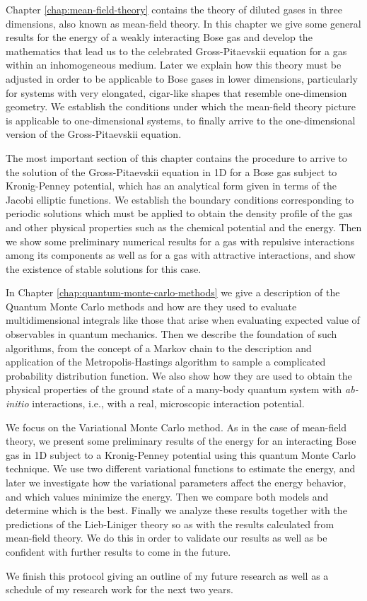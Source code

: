 Chapter \ref{chap:mean-field-theory} contains the theory of diluted gases in
three dimensions, also known as mean-field theory. In this chapter we give some
general results for the energy of a weakly interacting Bose gas and develop the
mathematics that lead us to the celebrated Gross-Pitaevskii equation for a gas
within an inhomogeneous medium. Later we explain how this theory must be
adjusted in order to be applicable to Bose gases in lower dimensions,
particularly for systems with very elongated, cigar-like shapes that resemble
one-dimension geometry. We establish the conditions under which the mean-field
theory picture is applicable to one-dimensional systems, to finally arrive to
the one-dimensional version of the Gross-Pitaevskii equation.

The most important section of this chapter contains the procedure to arrive to
the solution of the Gross-Pitaevskii equation in 1D for a Bose gas subject to
Kronig-Penney potential, which has an analytical form given in terms of the
Jacobi elliptic functions. We establish the boundary conditions corresponding to
periodic solutions which must be applied to obtain the density profile of the
gas and other physical properties such as the chemical potential and the energy.
Then we show some preliminary numerical results for a gas with repulsive
interactions among its components as well as for a gas with attractive
interactions, and show the existence of stable solutions for this case.


In Chapter \ref{chap:quantum-monte-carlo-methods} we give a description of the
Quantum Monte Carlo methods and how are they used to evaluate multidimensional
integrals like those that arise when evaluating expected value of observables in
quantum mechanics. Then we describe the foundation of such algorithms, from the
concept of a Markov chain to the description and application of the
Metropolis-Hastings algorithm to sample a complicated probability distribution
function. We also show how they are used to obtain the physical properties of
the ground state of a many-body quantum system with \textit{ab-initio}
interactions, i.e., with a real, microscopic interaction potential.

We focus on the Variational Monte Carlo method. As in the case of mean-field
theory, we present some preliminary results of the energy for an interacting
Bose gas in 1D subject to a Kronig-Penney potential using this quantum Monte
Carlo technique. We use two different variational functions to estimate the
energy, and later we investigate how the variational parameters affect the
energy behavior, and which values minimize the energy. Then we compare both
models and determine which is the best. Finally we analyze these results
together with the predictions of the Lieb-Liniger theory so as with the results
calculated from mean-field theory. We do this in order to validate our results
as well as be confident with further results to come in the future.

We finish this protocol giving an outline of my future research as well as a
schedule of my research work for the next two years.
